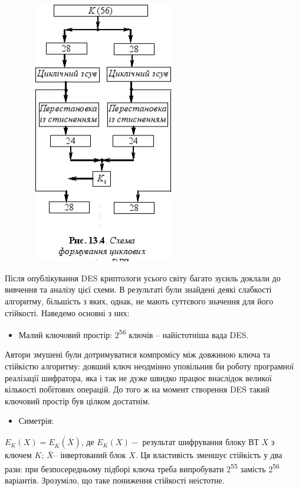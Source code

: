 \documentclass[a4paper]{article}
\newcommand\liststyleWWviiiNumxlix{%
\renewcommand\labelitemi{\textlatin{[F0B7?]}}
\renewcommand\labelitemii{o}
\renewcommand\labelitemiii{\textlatin{[F0A7?]}}
\renewcommand\labelitemiv{\textlatin{[F0B7?]}}
}
\newcounter{}
\begin{document}
\begin{figure}
\centering
\includegraphics[width=2.6492in,height=4.5236in]{crypt-img/crypt-img297.png}
\end{figure}
Після опублікування DES  криптологи усього світу багато зусиль доклали  до
вивчення та аналізу цієї схеми. В результаті були знайдені деякі слабкості
алгоритму, більшість з яких, однак, не мають суттєвого значення для його
стійкості. Наведемо основні з них:

\liststyleWWviiiNumxlix
\begin{itemize}
\item Малий ключовий простір: 2\textsuperscript{56} ключів – найістотніша вада
DES. 
\end{itemize}
Автори змушені були дотримуватися компромісу між довжиною ключа та стійкістю
алгоритму: довший ключ неодмінно уповільнив би роботу програмної реалізації
шифратора, яка і так не дуже швидко працює внаслідок великої кількості
побітових операцій. До того ж на момент створення DES такий ключовий простір
був цілком достатнім.

\liststyleWWviiiNumxlix
\begin{itemize}
\item Симетрія:
\end{itemize}
 ${E_{{K}}(X)=\overline{{E_{{\overline{{K}}}}(\overline{{X}})}}}$, де 
${E_{{K}}(X)-}$ результат шифрування блоку ВТ  ${X}$ з ключем  ${K}$; 
${\overline{{X}}}$– інвертований блок  ${X}$. Ця властивість зменшує стійкість
у два рази: при безпосередньому підборі ключа треба випробувати
2\textsuperscript{55} замість 2\textsuperscript{56} варіантів. Зрозуміло, що
таке пониження стійкості неістотне.
\end{document}
